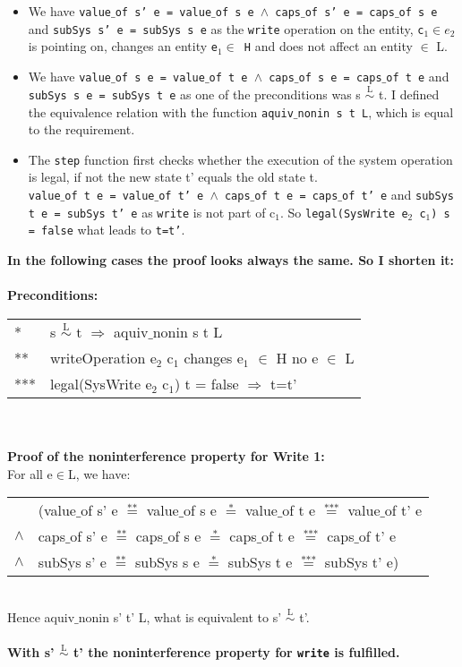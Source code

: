 \begin{itemize}
\item We have \texttt{value$\_$of s' e = value$\_$of s e $\wedge$ caps$\_$of s' e = caps$\_$of s e} and \texttt{subSys s' e = subSys s e} as the \texttt{write} operation on the entity, \texttt{c$_1 \in e_2$} is pointing on, changes an entity \texttt{e$_1 \in$ H} and does not affect an entity $\in$ L.
\item We have \texttt{value$\_$of s e = value$\_$of t e $\wedge$ caps$\_$of s e = caps$\_$of t e} and \texttt{subSys s e = subSys t e} as one of the preconditions was s $\overset{\text{L}}{\sim}$ t. I defined the equivalence relation with the function \texttt{aquiv$\_$nonin s t L}, which is equal to the requirement. 
\item The \texttt{step} function first checks whether the execution of the system operation is legal, if not the new state t' equals the old state t. \\
\texttt{value$\_$of t e = value$\_$of t' e $\wedge$ caps$\_$of t e = caps$\_$of t' e} and \texttt{subSys t e = subSys t' e} as \texttt{write} is not part of c$_1$. So \texttt{legal(SysWrite e$_2$ c$_1$) s = false} what leads to \texttt{t=t'}. \\
\end{itemize} 
\textbf{In the following cases the proof looks always the same. So I shorten it:} \\ \\
\textbf{Preconditions:} \\ 
\begin{tabular}{ll}
* & s $\overset{\text{L}}{\sim}$ t $\Rightarrow$ aquiv$\_$nonin s t L	\\ 
** & writeOperation e$_2$ c$_1$  changes e$_1$ $\in$ H no e $\in$ L \\
*** & legal(SysWrite e$_2$ c$_1$) t = false $\Rightarrow$ t=t'
\end{tabular} \\ \\ 
\textbf{Proof of the noninterference property for Write 1:} \\ 
For all e$\in$L, we have: \\
\begin{tabular}{ll}
& (value$\_$of s' e $\overset{\text{**}}{=}$ value$\_$of s e $\overset{\text{*}}{=}$ value$\_$of t e $\overset{\text{***}}{=}$ value$\_$of t' e \\
$\wedge$ & caps$\_$of s' e $\overset{\text{**}}{=}$ caps$\_$of s e $\overset{\text{*}}{=}$ caps$\_$of t e $\overset{\text{***}}{=}$ caps$\_$of t' e \\
$\wedge$ & subSys s' e $\overset{\text{**}}{=}$ subSys s e $\overset{\text{*}}{=}$ subSys t e $\overset{\text{***}}{=}$ subSys t' e)
\end{tabular} \\
Hence aquiv$\_$nonin s' t' L, what is equivalent to s' $\overset{\text{L}}{\sim}$ t'. \\ \\
\textbf{With s' $\overset{\text{L}}{\sim}$ t' the noninterference property for \texttt{write} is fulfilled.} 